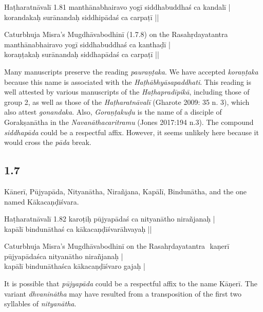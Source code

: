 \begin{ekdosis}
\begin{testimonia}[hp01_006]
Haṭharatnāvalī 1.81
\startverse
manthānabhairavo yogī siddhabuddhaś ca kandalī |\\
korandakaḥ surānandaḥ siddhipādaś ca carpaṭī ||
\endverse

Caturbhuja Misra's Mugdhāvabodhinī (1.7.8) on the Rasahṛdayatantra
\startverse
manthānabhairavo yogī siddhabuddhaś ca kanthaḍī |\\
koraṇṭakaḥ surānandaḥ siddhapādaś ca carpaṭī ||
\endverse
\end{testimonia}

\begin{philcomm}[hp01_006]        
Many manuscripts preserve the reading \emph{pauraṇṭaka}. We have accepted \emph{koraṇṭaka} because this name is associated with the \emph{Haṭhābhyāsapaddhati}. This reading is well attested by various manuscripts of the \emph{Haṭhapradīpikā}, including those of group 2, as well as those of the \emph{Haṭharatnāvalī} (Gharote 2009: 35 n. 3), which also attest \emph{gonandaka}. Also, \emph{Goraṇṭakuḍu} is the name of a disciple of Gorakṣanātha in the \emph{Navanāthacaritramu} (Jones 2017:194 n.3). The compound \emph{siddhapāda} could be a respectful affix. However, it seems unlikely here because it would cross the \emph{pāda} break.  
\end{philcomm}

\subsection*{1.7}
\begin{translation}[hp01_007]
Kānerī, Pūjyapāda, Nityanātha, Nirañjana, Kapālī, Bindunātha, and the one named Kākacaṇḍīśvara.
\end{translation}

\begin{testimonia}[hp01_007]
Haṭharatnāvalī 1.82
\startverse
karoṭiḥ pūjyapādaś ca nityanātho nirañjanaḥ |\\
kapālī bindunāthaś ca kākacaṇḍīśvarāhvayaḥ || 
\endverse

Caturbhuja Misra's Mugdhāvabodhinī on the Rasahṛdayatantra
​​\startverse
kaṇerī pūjyapādaśca nityanātho nirañjanaḥ |\\
kapālī bindunāthaśca kākacaṇḍīśvaro gajaḥ |
\endverse
\end{testimonia}

\begin{philcomm}[hp01_007]   
It is possible that \emph{pūjyapāda} could be a respectful affix to the name Kāṇerī. The variant \emph{dhvaninātha} may have resulted from a transposition of the first two syllables of \emph{nityanātha}.    
\end{philcomm}


\end{ekdosis}
